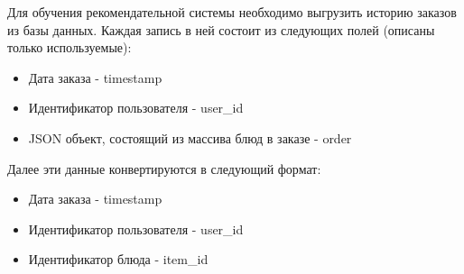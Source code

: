 Для обучения рекомендательной системы необходимо выгрузить историю заказов из базы
данных. Каждая запись в ней состоит из следующих полей (описаны только используемые):
\begin{itemize}
  \item Дата заказа - timestamp
  \item Идентификатор пользователя - user\_id
  \item JSON объект, состоящий из массива блюд в заказе - order
\end{itemize}
Далее эти данные конвертируются в следующий формат:
\begin{itemize}
  \item Дата заказа - timestamp
  \item Идентификатор пользователя - user\_id
  \item Идентификатор блюда - item\_id
\end{itemize}
